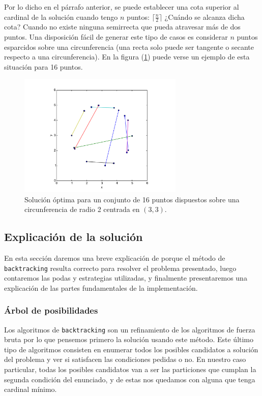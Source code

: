Por lo dicho en el párrafo anterior, se puede establecer una cota superior al cardinal de la solución cuando tengo $n$ puntos: $\lceil\frac{n}{2}\rceil$ ¿Cuándo se alcanza dicha cota? Cuando no existe ninguna semirrecta que pueda atravesar más de dos puntos. Una disposición fácil de generar este tipo de casos es considerar $n$ puntos esparcidos sobre una circunferencia (una recta solo puede ser tangente o secante respecto a una circunferencia). En la figura (\ref{fig:ej3-5}) puede verse un ejemplo de esta situación para 16 puntos.

\begin{figure}[H]
  \centering
  \includegraphics[width=0.70\textwidth]{img/ejemplos/ej3-5.pdf}
  \caption{\footnotesize Solución óptima para un conjunto de 16 puntos dispuestos sobre una circunferencia de radio 2 centrada en $(3,3)$.}
  \label{fig:ej3-5}
\end{figure}

\subsection{Explicación de la solución}
En esta sección daremos una breve explicación de porque el método de \texttt{backtracking} resulta correcto para resolver el problema presentado,  luego contaremos las podas y estrategias utilizadas, y finalmente presentaremos una explicación de las partes fundamentales de la implementación. 

\subsubsection{Árbol de posibilidades}
Los algoritmos de \texttt{backtracking} son un refinamiento de los algoritmos de fuerza bruta por lo que pensemos primero la solución usando este método. Este último tipo de algoritmos consisten en enumerar todos los posibles candidatos a solución del problema y ver si satisfacen las condiciones pedidas o no. En nuestro caso particular, todas los posibles candidatos van a ser las particiones que cumplan la segunda condición del enunciado, y de estas nos quedamos con alguna que tenga cardinal mínimo. 

